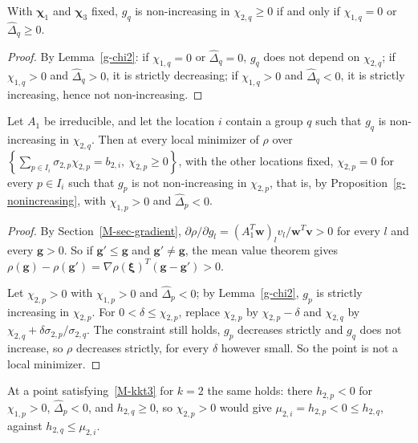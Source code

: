 \begin{proposition}\label{g-nonincreasing}
With $\bm\chi_1$ and $\bm\chi_3$ fixed, $g_q$ is non-increasing in
$\chi_{2,q}\ge 0$ if and only if $\chi_{1,q}=0$ or $\widehat\Delta_q\ge 0$.
\end{proposition}
\begin{proof}
By Lemma~\ref{g-chi2}: if $\chi_{1,q}=0$ or $\widehat\Delta_q=0$, $g_q$ does not depend
on $\chi_{2,q}$; if $\chi_{1,q}>0$ and $\widehat\Delta_q>0$, it is strictly decreasing;
if $\chi_{1,q}>0$ and $\widehat\Delta_q<0$, it is strictly increasing, hence not
non-increasing.
\end{proof}

\begin{proposition}\label{no-second}
Let $A_1$ be irreducible, and let the location $i$ contain a group $q$ such
that $g_q$ is non-increasing in $\chi_{2,q}$. Then at every local minimizer of
$\rho$ over
$\left\{\sum_{p\in I_i}\sigma_{2,p}\chi_{2,p}=b_{2,i},\ \chi_{2,p}\ge 0\right\}$,
with the other locations fixed, $\chi_{2,p}=0$ for every $p\in I_i$ such that
$g_p$ is not non-increasing in $\chi_{2,p}$, that is, by
Proposition~\ref{g-nonincreasing}, with $\chi_{1,p}>0$ and $\widehat\Delta_p<0$.
\end{proposition}
\begin{proof}
By Section~\ref{M-sec-gradient}, $\partial\rho/\partial g_l=\left(A_1^T\bm w\right)_lv_l/\bm w^T\bm v>0$
for every $l$ and every $\bm g>0$. So if $\bm g'\le\bm g$ and $\bm g'\ne\bm g$, the
mean value theorem gives
$\rho(\bm g)-\rho(\bm g')=\nabla\rho(\bm\xi)^T(\bm g-\bm g')>0$.

Let $\chi_{2,p}>0$ with $\chi_{1,p}>0$ and $\widehat\Delta_p<0$; by
Lemma~\ref{g-chi2}, $g_p$ is strictly increasing in $\chi_{2,p}$. For
$0<\delta\le\chi_{2,p}$, replace $\chi_{2,p}$ by $\chi_{2,p}-\delta$ and $\chi_{2,q}$
by $\chi_{2,q}+\delta\sigma_{2,p}/\sigma_{2,q}$. The constraint still holds,
$g_p$ decreases strictly and $g_q$ does not increase, so
$\rho$ decreases strictly, for every $\delta$ however small. So the point is
not a local minimizer.
\end{proof}

At a point satisfying~\eqref{M-kkt3} for $k=2$ the same holds: there
$h_{2,p}<0$ for $\chi_{1,p}>0$, $\widehat\Delta_p<0$, and $h_{2,q}\ge 0$, so
$\chi_{2,p}>0$ would give $\mu_{2,i}=h_{2,p}<0\le h_{2,q}$, against
$h_{2,q}\le\mu_{2,i}$.


